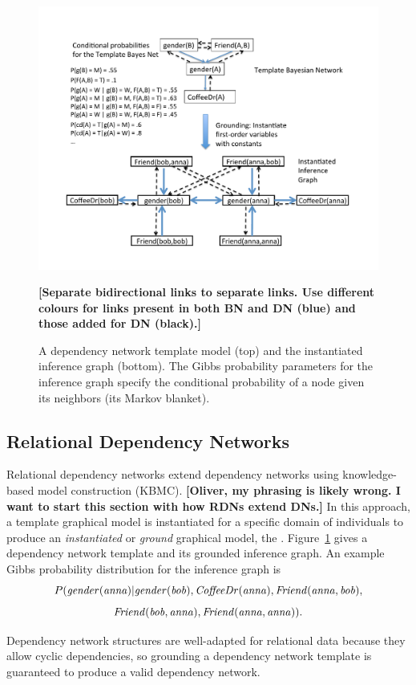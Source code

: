 \documentclass[runningheads,a4paper]{llncs}
\newcommand{\fixneeded}[1]{\textbf{[\footnotesize #1]}}
\begin{document}
\begin{figure}[htbp]
\begin{center}
\includegraphics[width = 0.7 \textwidth]{figures/dn}
\caption{A dependency network template model (top) and the instantiated inference graph (bottom). The Gibbs probability parameters for the inference graph specify the conditional probability of a node given its neighbors (its Markov blanket). \label{fig:dn}}
\fixneeded{Separate bidirectional links to separate links. Use different colours for links present in both BN and DN (blue) and those added for DN (black).}
\end{center}
\end{figure}

 
\subsection{Relational Dependency Networks} Relational dependency networks extend dependency networks using knowledge-based model construction (KBMC). \fixneeded{Oliver, my phrasing is likely wrong. I want to start this section with how RDNs extend DNs.} \cite{Neville2007,Natarajan2012} In this approach, a template graphical model is instantiated for a specific domain of individuals to produce an {\em  instantiated} or {\em ground} graphical model, the  \cite{Neville2007}. Figure~\ref{fig:dn} gives a dependency network template and its grounded inference graph. An example Gibbs probability distribution for the inference graph is $$P(\it{gender}(anna)|\it{gender(bob)}, \it{CoffeeDr(anna)}, \it{Friend(anna,bob)},$$ $$\it{Friend(bob,anna)},\it{Friend(anna,anna)}).$$

Dependency network structures are well-adapted for relational data because they allow cyclic dependencies, so grounding a dependency network template is guaranteed to produce a valid dependency network.
\end{document}
